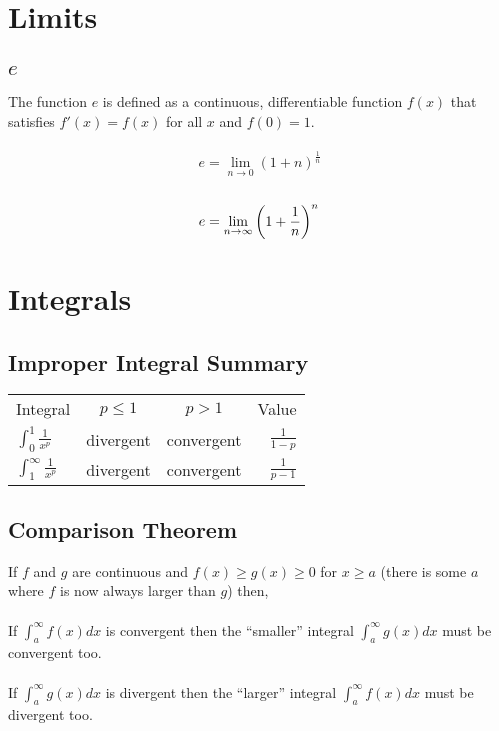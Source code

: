 \documentclass[12pt]{article}
\begin{document}
\section{Limits}


\subsection{$e$}

The function $e$ is defined as a continuous, differentiable function
$f(x)$ that satisfies $f'(x) = f(x)$ for all $x$ and $f(0) = 1$.\\
\\
\begin{displaymath}
    e = \displaystyle\lim_{n \to 0} \left(1 + n\right)^{\frac{1}{n}}
\end{displaymath}
\\
\begin{displaymath}
    e = \lim_{n \to \infty} \left(1 + \frac{1}{n}\right)^n\\
\end{displaymath}


\section{Integrals}


\subsection{Improper Integral Summary}

\def\arraystretch{3}
\begin{tabular}{lccr}
    Integral & $p \leq 1$ & $p > 1$ & Value\\
    $\displaystyle\int_{0}^{1} \frac{1}{x^p}$ & divergent & convergent & $\displaystyle\frac{1}{1-p}$\\
    $\displaystyle\int_{1}^{\infty} \frac{1}{x^p}$ & divergent & convergent & $\displaystyle\frac{1}{p-1}$\\
\end{tabular}


\subsection{Comparison Theorem}

If $f$ and $g$ are continuous and
$f(x) \geq g(x) \geq 0$ for $x \geq a$
(there is some $a$ where $f$ is now always larger than $g$)
then,\\
\\
If $\int_{a}^{\infty} f(x)dx$ is convergent then the ``smaller'' integral
$\int_{a}^{\infty} g(x)dx$ must be convergent too.\\
\\
If $\int_{a}^{\infty} g(x)dx$ is divergent then the ``larger'' integral
$\int_{a}^{\infty} f(x)dx$ must be divergent too.\\
\end{document}

